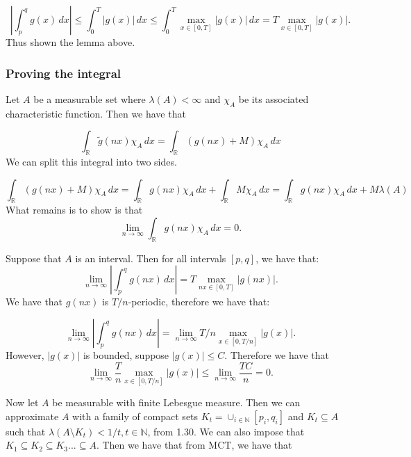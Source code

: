 \documentclass{article}
\theoremstyle{definition}
\numberwithin{theorem}{section}
\numberwithin{equation}{section}
\begin{document}
\begin{equation}
	\left| \int_{p}^{q} g(x) \, dx \right| \leq \int_{0}^T |g(x)| \, dx \leq \int_{0}^T \max_{x \in [0, T]} |g(x)| \, dx = T \max_{x \in [0, T]} |g(x)|.
\end{equation}
Thus shown the lemma above. 

\subsubsection{Proving the integral}
Let $A$ be a measurable set where $\lambda(A) < \infty$ and $\chi_A$ be its associated characteristic function. Then we have that

\begin{equation}
	\int_{\mathbb{R}} \tilde{g}(nx) \chi_A \, dx = \int_{\mathbb{R}} \left(g(nx) + M\right) \chi_A \, dx
\end{equation}
We can split this integral into two sides. 

\begin{equation}
	\int_{\mathbb{R}} \left(g(nx) + M\right) \chi_A \, dx = \int_{\mathbb{R}}  g(nx) \chi_A \, dx + \int_{\mathbb{R}} M \chi_A \, dx = \int_{\mathbb{R}}  g(nx) \chi_A \, dx + M \lambda(A)
\end{equation}
What remains is to show is that
\begin{equation}
	\lim_{n \rightarrow \infty} \int_{\mathbb{R}}  g(nx) \chi_A \, dx = 0. 
\end{equation}

Suppose that $A$ is an interval. Then for all intervals $[p, q]$, we have that:
\begin{equation}
	\lim_{n \rightarrow \infty} \left| \int_{p}^{q} g(nx) \, dx \right| = T \max_{nx \in [0, T]} |g(nx)|.
\end{equation}
We have that $g(nx)$ is $T/n$-periodic, therefore we have that:

\begin{equation}
	\lim_{n \rightarrow \infty} \left| \int_{p}^{q} g(nx) \, dx \right| =\lim_{n \rightarrow \infty}  T/n \max_{x \in [0, T/n]} |g(x)|.
\end{equation}
However, $|g(x)|$ is bounded, suppose $|g(x)| \leq C$. Therefore we have that 
\begin{equation}
	\lim_{n \rightarrow \infty} \frac{T}{n} \max_{x \in [0, T/n]} |g(x)| \leq \lim_{n \rightarrow \infty} \frac{TC}{n} = 0.
\end{equation}

Now let $A$ be measurable with finite Lebesgue measure. Then we can approximate $A$ with a family of compact sets $K_t = \cup_{i \in \mathbb{N}} [p_i, q_i]$ and $K_t \subseteq A$ such that $\lambda(A \setminus K_t) < 1/t, t \in \mathbb{N}$, from 1.30. We can also impose that $K_1 \subseteq K_2 \subseteq K_3 ... \subseteq A$.
Then we have that from MCT, we have that
\end{document}
